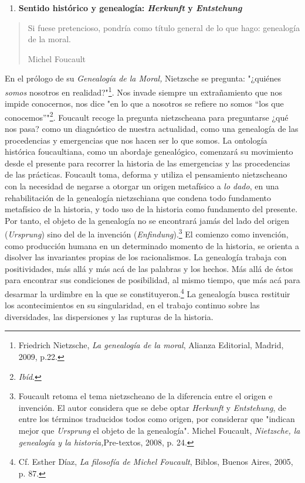 \documentclass{book}
\begin{document}
\begin{enumerate}
\def\labelenumi{\arabic{enumi}.}
\setcounter{enumi}{2}
\item
  \textbf{Sentido histórico y genealogía: \emph{Herkunft} y
  \emph{Entstehung}}
\end{enumerate}

\begin{quote}
Si fuese pretencioso, pondría como título general de lo que hago:
genealogía de la moral.

Michel Foucault
\end{quote}

En el prólogo de su \emph{Genealogía de la Moral,} Nietzsche se
pregunta: "¿quiénes \emph{somos} nosotros en realidad?"\footnote{Friedrich
  Nietzsche, \emph{La genealogía de la moral}, Alianza Editorial,
  Madrid, 2009, p.22.}. Nos invade siempre un extrañamiento que nos
impide conocernos, nos dice "en lo que a nosotros se refiere no somos
``los que conocemos''"\footnote{\emph{Ibíd}.}. Foucault recoge la
pregunta nietzscheana para preguntarse ¿qué nos pasa? como un
diagnóstico de nuestra actualidad, como una genealogía de las
procedencias y emergencias que nos hacen ser lo que somos. La ontología
histórica foucaultiana, como un abordaje genealógico, comenzará su
movimiento desde el presente para recorrer la historia de las
emergencias y las procedencias de las prácticas. Foucault toma, deforma
y utiliza el pensamiento nietzscheano con la necesidad de negarse a
otorgar un origen metafísico a \emph{lo dado}, en una rehabilitación de
la genealogía nietzschiana que condena todo fundamento metafísico de la
historia, y todo uso de la historia como fundamento del presente. Por
tanto, el objeto de la genealogía no se encontrará jamás del lado del
origen (\emph{Ursprung}) sino del de la invención
(\emph{Enfindung}).\footnote{Foucault retoma el tema nietzscheano de la
  diferencia entre el origen e invención. El autor considera que se debe
  optar \emph{Herkunft} y \emph{Entstehung}, de entre los términos
  traducidos todos como origen, por considerar que "indican mejor que
  \emph{Ursprung} el objeto de la genealogía". Michel Foucault,
  \emph{Nietzsche, la genealogía y la historia,}Pre-textos, 2008, p. 24.}
El comienzo como invención, como producción humana en un determinado
momento de la historia, se orienta a disolver las invariantes propias de
los racionalismos. La genealogía trabaja con positividades, más allá y
más acá de las palabras y los hechos. Más allá de éstos para encontrar
sus condiciones de posibilidad, al mismo tiempo, que más acá para
desarmar la urdimbre en la que se constituyeron.\footnote{Cf. Esther
  Díaz, \emph{La filosofía de Michel Foucault}, Biblos, Buenos Aires,
  2005, p. 87.} La genealogía busca restituir los acontecimientos en su
singularidad, en el trabajo continuo sobre las diversidades, las
dispersiones y las rupturas de la historia.
\end{document}
